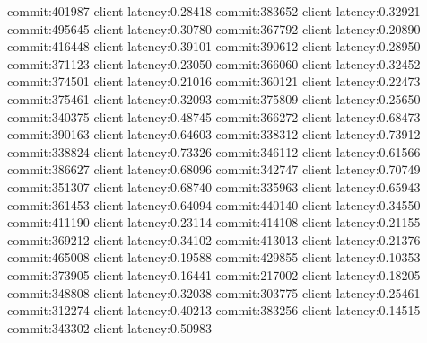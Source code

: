 commit:401987 client latency:0.28418
commit:383652 client latency:0.32921
commit:495645 client latency:0.30780
commit:367792 client latency:0.20890
commit:416448 client latency:0.39101
commit:390612 client latency:0.28950
commit:371123 client latency:0.23050
commit:366060 client latency:0.32452
commit:374501 client latency:0.21016
commit:360121 client latency:0.22473
commit:375461 client latency:0.32093
commit:375809 client latency:0.25650
commit:340375 client latency:0.48745
commit:366272 client latency:0.68473
commit:390163 client latency:0.64603
commit:338312 client latency:0.73912
commit:338824 client latency:0.73326
commit:346112 client latency:0.61566
commit:386627 client latency:0.68096
commit:342747 client latency:0.70749
commit:351307 client latency:0.68740
commit:335963 client latency:0.65943
commit:361453 client latency:0.64094
commit:440140 client latency:0.34550
commit:411190 client latency:0.23114
commit:414108 client latency:0.21155
commit:369212 client latency:0.34102
commit:413013 client latency:0.21376
commit:465008 client latency:0.19588
commit:429855 client latency:0.10353
commit:373905 client latency:0.16441
commit:217002 client latency:0.18205
commit:348808 client latency:0.32038
commit:303775 client latency:0.25461
commit:312274 client latency:0.40213
commit:383256 client latency:0.14515
commit:343302 client latency:0.50983